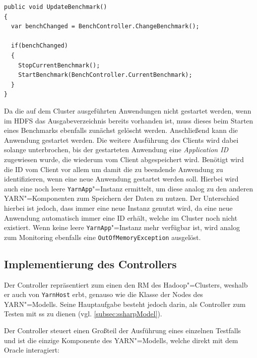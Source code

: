 \begin{lstlisting}[label=lst:startClientBenchmark,style=cs,
caption={[Auswahl und Start des nachfolgenden Benchmarks]
    Auswahl und Start des nachfolgenden Benchmarks (gekürzt).
    Der Benchmark"=Controller und seine Methode \texttt{BenchmarkController.ChangeBenchmark()} wird in \cref{sec:benchmarkController} erläutert.}]
public void UpdateBenchmark()
{
  var benchChanged = BenchController.ChangeBenchmark();
  
  if(benchChanged)
  {
    StopCurrentBenchmark();
    StartBenchmark(BenchController.CurrentBenchmark);
  }
}
\end{lstlisting}

Da die auf dem Cluster ausgeführten Anwendungen \uU nicht gestartet werden, wenn im \ac{HDFS} das Ausgabeverzeichnis bereits vorhanden ist, muss dieses beim Starten eines Benchmarks ebenfalls zunächst gelöscht werden.
Anschließend kann die Anwendung gestartet werden.
Die weitere Ausführung des Clients wird dabei solange unterbrochen, bis der gestarteten Anwendung eine \emph{Application ID} zugewiesen wurde, die wiederum vom Client abgespeichert wird.
Benötigt wird die ID vom Client vor allem um damit die zu beendende Anwendung zu identifizieren, wenn eine neue Anwendung gestartet werden soll.
Hierbei wird auch eine noch leere \texttt{YarnApp}"=Instanz ermittelt, um diese analog zu den anderen \ac{YARN}"=Komponenten zum Speichern der Daten zu nutzen.
Der Unterschied hierbei ist jedoch, dass immer eine neue Instanz genutzt wird, da eine neue Anwendung automatisch immer eine ID erhält, welche im Cluster noch nicht existiert.
Wenn keine leere \texttt{YarnApp}"=Instanz mehr verfügbar ist, wird analog zum Monitoring ebenfalls eine \texttt{OutOfMemoryException} ausgelöst.

\subsection{Implementierung des Controllers}
\label{subsec:yarnController}

Der Controller repräsentiert zum einen den \ac{RM} des Hadoop"=Clusters, weshalb er auch von \texttt{YarnHost} erbt, genauso wie die Klasse der Nodes des \ac{YARN}"=Modells.
Seine Hauptaufgabe besteht jedoch darin, als Controller zum Testen mit \ac{ss} zu dienen (vgl. \cref{subsec:ssharpModel}).

Der Controller steuert einen Großteil der Ausführung eines einzelnen Testfalls und ist die einzige Komponente des \ac{YARN}"=Modells, welche direkt mit dem Oracle interagiert:

